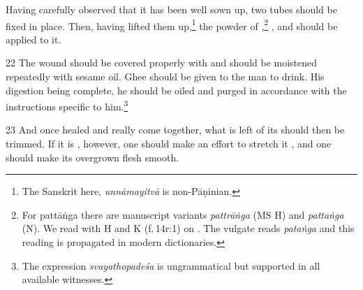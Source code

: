 \begin{translation}
    Having carefully observed that it has been well sown up,
    two tubes should be fixed in place.  Then, having lifted them up,\footnote{The 
    Sanskrit here, \emph{unnāmayitvā} is  non-Pāṇinian.}
    the powder of
    ,\footnote{For {pattāṅga} there are manuscript variants 
    \emph{pattrāṅga} (MS H) and \emph{pattaṅga}    (N).  We read with H and K 
    (f.\,14r:1) on \citet[1.14.36]{vulgate}. The vulgate reads \emph{pataṅga} 
    and this reading is propagated in modern dictionaries.}
    ,
    and
    should be applied to it.
    
    \item[22] 
    The wound should be covered properly with  and should be
    moistened repeatedly with sesame oil.  Ghee should be given to the man to
    drink.  His digestion being complete, he should be oiled and purged in
    accordance with the instructions specific to him.\footnote{The expression 
    \emph{svayathopadeśa} is ungrammatical but supported in all available 
    witnesses.}   
    
    \item[23] %
    And once healed and really come together, what is left of its 
    should then be trimmed. If it is  , however, one should make an
    effort to stretch it , and one should make its overgrown flesh smooth.
    
    
\end{translation}    
